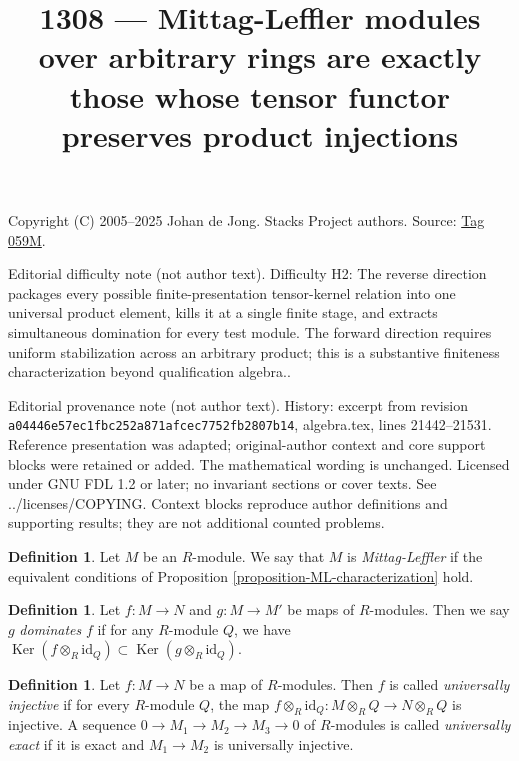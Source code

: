 \documentclass{amsart}
\theoremstyle{plain}
\theoremstyle{definition}
\newtheorem{definition}[subsection]{Definition}
\theoremstyle{remark}
\numberwithin{equation}{subsection}
\def\Ker{\mathop{\mathrm{Ker}}}
\begin{document}
\title[Stacks Project, Tag 059M]{1308 --- Mittag-Leffler modules over arbitrary rings are exactly those whose tensor functor preserves product injections}
\maketitle
\noindent Copyright (C) 2005--2025 Johan de Jong. Stacks Project authors. Source: \href{https://stacks.math.columbia.edu/tag/059M}{Tag 059M}.

\noindent Editorial difficulty note (not author text). Difficulty H2: The reverse direction packages every possible finite-presentation tensor-kernel relation into one universal product element, kills it at a single finite stage, and extracts simultaneous domination for every test module. The forward direction requires uniform stabilization across an arbitrary product; this is a substantive finiteness characterization beyond qualification algebra..

\noindent Editorial provenance note (not author text). History: excerpt from revision \texttt{a0444\allowbreak 6e57e\allowbreak c1fbc\allowbreak 252a8\allowbreak 71afc\allowbreak ec775\allowbreak 2fb28\allowbreak 07b14}, algebra.tex, lines 21442--21531. Reference presentation was adapted; original-author context and core support blocks were retained or added. The mathematical wording is unchanged. Licensed under GNU FDL 1.2 or later; no invariant sections or cover texts. See ../licenses/COPYING. Context blocks reproduce author definitions and supporting results; they are not additional counted problems.

\begin{definition}
\label{definition-mittag-leffler-module}
Let $M$ be an $R$-module.  We say that $M$ is {\it Mittag-Leffler} if the
equivalent conditions of
Proposition \ref{proposition-ML-characterization}
hold.
\end{definition}

\begin{definition}
\label{definition-domination}
Let $f: M \to N$ and $g: M \to M'$ be maps of $R$-modules.
Then we say $g$ {\it dominates} $f$ if for any $R$-module $Q$, we have $\Ker(f
\otimes_R \text{id}_Q) \subset \Ker(g \otimes_R \text{id}_Q)$.
\end{definition}

\begin{definition}
\label{definition-universally-injective}
Let $f: M \to N$ be a map of $R$-modules.  Then $f$ is called
{\it universally injective} if for every $R$-module $Q$, the map $f
\otimes_R \text{id}_Q: M \otimes_R Q \to N \otimes_R Q$
is injective.  A sequence $0 \to M_1 \to M_2 \to M_3
\to 0$ of $R$-modules is called {\it universally exact} if it is exact
and $M_1 \to M_2$ is universally injective.
\end{definition}
\end{document}

